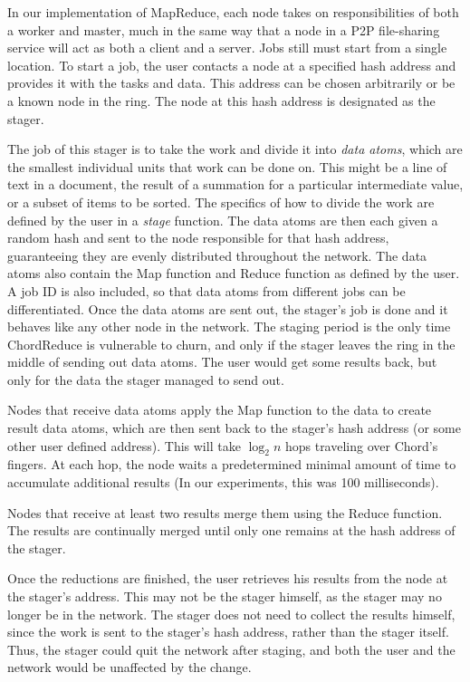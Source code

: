 \documentclass[10pt, conference, compsocconf]{IEEEtran}
\begin{document}
In our implementation of MapReduce, each node takes on responsibilities of both a worker and master, much in the same way that a node in a P2P file-sharing service will act as both a client and a server.  Jobs still must start from a single location.  To start a job, the user contacts a node at a specified hash address and provides it with the tasks and data.  This address can be chosen arbitrarily or be a known node in the ring. The node at this hash address is designated as the stager.  

The job of this stager is to take the work and divide it into \emph{data atoms}, which are the smallest individual units that work can be done on.  This might be a line of text in a document, the result of a summation for a particular intermediate value, or a subset of items to be sorted.  The specifics of how to divide the work are defined by the user in a \emph{stage} function.  The data atoms are then each given a random hash and sent to the node responsible for that hash address, guaranteeing they are evenly distributed throughout the network.  The data atoms also contain the Map function and Reduce function as defined by the user.  A job ID is also included, so that data atoms from different jobs can be differentiated.  Once the data atoms are sent out, the stager's job is done and it behaves like any other node in the network. The staging period is the only time ChordReduce is vulnerable to churn, and only if the stager leaves the ring in the middle of sending out data atoms.  The user would get some results back, but only for the data the stager managed to send out.

Nodes that receive data atoms apply the Map function to the data to create result data atoms, which are then sent back to the stager's hash address (or some other user defined address).  This will take $\log_{2} n$ hops traveling over Chord's fingers.  At each hop, the node waits a predetermined minimal amount of time to accumulate additional results (In our experiments, this was 100 milliseconds).

Nodes that receive at least two results merge them using the Reduce function.  The results are continually merged until only one remains at the hash address of the stager. 

Once the reductions are finished, the user retrieves his results from the node at the stager's address.  This may not be the stager himself, as the stager may no longer be in the network.  The stager does not need to collect the results himself, since the work is sent to the stager's hash address, rather than the stager itself.  Thus, the stager could quit the network after staging, and both the user and the network would be unaffected by the change. %
\end{document}
